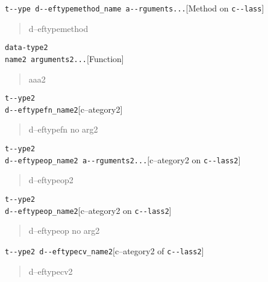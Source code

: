 \documentclass{book}
\begin{document}
\noindent\texttt{t{-}{-}ype d{-}{-}eftypemethod\_name a{-}{-}rguments...}\hfill[Method on \texttt{c{-}{-}lass}]

%
\begin{quote}
\unskip{\parskip=0pt\noindent}%
d--eftypemethod
\end{quote}


\noindent\texttt{data-type2\leavevmode{}\\name2 arguments2...}\hfill[Function]

%
\begin{quote}
\unskip{\parskip=0pt\noindent}%
aaa2
\end{quote}

\noindent\texttt{t{-}{-}ype2\leavevmode{}\\d{-}{-}eftypefn\_name2}\hfill[c--ategory2]

%
\begin{quote}
\unskip{\parskip=0pt\noindent}%
d--eftypefn no arg2
\end{quote}

\noindent\texttt{t{-}{-}ype2\leavevmode{}\\d{-}{-}eftypeop\_name2 a{-}{-}rguments2...}\hfill[c--ategory2 on \texttt{c{-}{-}lass2}]

%
\begin{quote}
\unskip{\parskip=0pt\noindent}%
d--eftypeop2
\end{quote}

\noindent\texttt{t{-}{-}ype2\leavevmode{}\\d{-}{-}eftypeop\_name2}\hfill[c--ategory2 on \texttt{c{-}{-}lass2}]

%
\begin{quote}
\unskip{\parskip=0pt\noindent}%
d--eftypeop no arg2
\end{quote}

\noindent\texttt{t{-}{-}ype2 d{-}{-}eftypecv\_name2}\hfill[c--ategory2 of \texttt{c{-}{-}lass2}]

%
\begin{quote}
\unskip{\parskip=0pt\noindent}%
d--eftypecv2
\end{quote}
\end{document}
